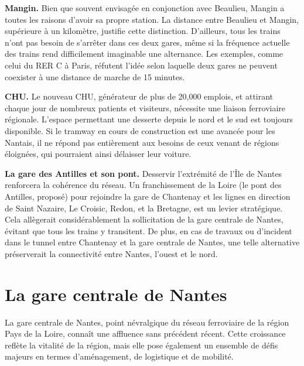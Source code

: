 \textbf{Mangin.}
Bien que souvent envisagée en conjonction avec Beaulieu, Mangin a
toutes les raisons d'avoir sa propre station. La distance entre
Beaulieu et Mangin, supérieure à un kilomètre, justifie cette
distinction. D’ailleurs, tous les trains n'ont pas besoin de s'arrêter
dans ces deux gares, même si la fréquence actuelle des trains rend
difficilement imaginable une alternance. Les exemples, comme celui du
RER C à Paris, réfutent l'idée selon laquelle deux gares ne peuvent
coexister à une distance de marche de 15 minutes.

\textbf{CHU.}
Le nouveau CHU, générateur de plus de 20,000 emplois, et attirant
chaque jour de nombreux patients et visiteurs, nécessite une liaison
ferroviaire régionale. L'espace permettant une desserte depuis le nord
et le sud est toujours disponible. Si le tramway en cours de
construction est une avancée pour les Nantais, il ne répond pas
entièrement aux besoins de ceux venant de régions éloignées, qui
pourraient ainsi délaisser leur voiture.

\textbf{La gare des Antilles et son pont.}  Desservir l’extrémité de
l'Île de Nantes renforcera la cohérence du réseau. Un franchissement
de la Loire (le pont des Antilles, proposé) pour rejoindre la gare de
Chantenay et les lignes en direction de Saint Nazaire, Le Croisic,
Redon, et la Bretagne, est un levier stratégique. Cela allègerait
considérablement la sollicitation de la gare centrale de Nantes,
évitant que tous les trains y transitent.  De plus, en cas de travaux
ou d'incident dans le tunnel entre Chantenay et la gare centrale de
Nantes, une telle alternative préserverait la connectivité entre
Nantes, l'ouest et le nord.




\section{La gare centrale de Nantes}

La gare centrale de Nantes, point névralgique du réseau ferroviaire de
la région Pays de la Loire, connaît une affluence sans précédent
récent. Cette croissance reflète la vitalité de la région, mais elle
pose également un ensemble de défis majeurs en termes d'aménagement,
de logistique et de mobilité.

